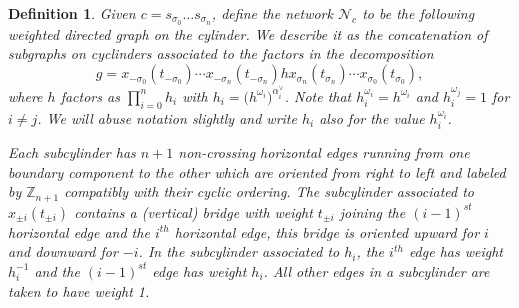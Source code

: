 \documentclass[12pt]{amsart}
\newcommand{\ZZ}{\mathbb{Z}}
\newcommand{\cN}{\mathcal{N}} %
\newtheorem{definition}[theorem]{Definition}
\numberwithin{equation}{section}
\begin{document}
\begin{definition}
Given $c = s_{\sigma_0} \dotsc s_{\sigma_n}$, define the \emph{network} $\cN_c$ to be the following weighted directed graph on the cylinder. We describe it as the concatenation of subgraphs on cyclinders associated to the factors in the decomposition 
\[g=x_{-\sigma_0}(t_{-\sigma_0})\cdots x_{-\sigma_n}(t_{-\sigma_n}) hx_{\sigma_n}(t_{\sigma_n}) \cdots x_{\sigma_0}(t_{\sigma_0}),\]
where $h$ factors as $\prod\limits_{i=0}^n h_i$ with $h_i=\big(h^{\omega_i}\big)^{\alpha_i^\vee}$.  Note that $h_i^{\omega_i}=h^{\omega_i}$ and $h_i^{\omega_j}=1$ for $i\ne j$.  We will abuse notation slightly and write $h_i$ also for the value $h_i^{\omega_i}$.

Each subcylinder has $n+1$ non-crossing \emph{horizontal} edges running from one boundary component to the other which are oriented from right to left and labeled by $\ZZ_{n+1}$ compatibly with their cyclic ordering.  The subcylinder associated to $x_{\pm i}(t_{\pm i})$ contains a (\emph{vertical}) \emph{bridge} with weight $t_{\pm i}$ joining the $(i-1)^{st}$ horizontal edge and the $i^{th}$ horizontal edge, this bridge is oriented upward for $i$ and downward for $-i$.  In the subcylinder associated to $h_i$, the $i^{th}$ edge has weight $h_i^{-1}$ and the $(i-1)^{st}$ edge has weight $h_i$.  All other edges in a subcylinder are taken to have weight 1.


\end{definition}
\end{document}

